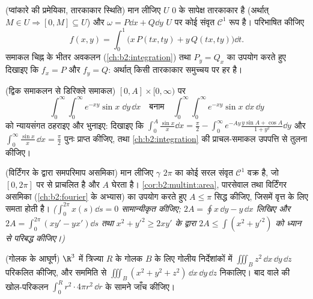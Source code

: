 \begin{exercise}[$\star\star\star$]\label{exo:b2:multint:8}
(प्वांकारे की प्रमेयिका, तारकाकार स्थिति) मान लीजिए $U$ $0$ के
सापेक्ष तारकाकार है (अर्थात् $M \in U \Rightarrow [0, M] \subseteq U$) और $\omega = P\dd x + Q\dd y$ $U$ पर कोई संवृत $\mathcal{C}^1$ रूप
है। परिभाषित कीजिए
\[
f(x, y) = \int_0^1 \bigl(x\,P(tx, ty) + y\,Q(tx, ty)\bigr)\dd t .
\]
समाकल चिह्न के भीतर अवकलन (\cref{ch:b2:integration}) तथा $P_y = Q_x$ का उपयोग करते हुए दिखाइए
कि $f_x = P$ और $f_y = Q$: अर्थात् किसी तारकाकार  समुच्चय पर हर   है।
\end{exercise}

\begin{exercise}[$\star\star\star$]\label{exo:b2:multint:9}
(द्विक समाकलन से डिरिक्ले समाकल) $[0, A] \times [0, \infty)$ पर
\[
\int_0^\infty\!\!\int_0^\infty e^{-xy}\sin x\;\dd y\,\dd x
\quad\text{बनाम}\quad
\int_0^\infty\!\!\int_0^\infty e^{-xy}\sin x\;\dd x\,\dd y
\]
को न्यायसंगत ठहराइए और भुनाइए: दिखाइए कि $\int_0^A \frac{\sin
x}{x}\dd x = \frac\pi2 - \int_0^\infty
e^{-Ay}\frac{y\sin A + \cos A}{1 + y^2}\dd y$ और $\int_0^\infty \frac{\sin x}{x}\,\dd x = \frac\pi2$ पुनः प्राप्त
कीजिए, तथा \cref{ch:b2:integration} की प्राचल-समाकल उपपत्ति से तुलना कीजिए।
\end{exercise}

\begin{exercise}[$\star\star\star$]\label{exo:b2:multint:10}
(विर्टिंगर के द्वारा समपरिमाप असमिका) मान लीजिए $\gamma$  $2\pi$ का
कोई सरल संवृत $\mathcal{C}^1$ वक्र है, जो $[0, 2\pi]$ पर  से प्राचलित है और
 $A$ घेरता है। \cref{cor:b2:multint:area}, पारसेवाल तथा विर्टिंगर असमिका
(\cref{ch:b2:fourier} के अभ्यास) का उपयोग करते हुए $A \leq \pi$ सिद्ध कीजिए, जिसमें वृत्त
के लिए समता होती है। \emph{($\int_0^{2\pi} x(s)\dd s
= 0$ सामान्यीकृत कीजिए; $2A = \oint x\,\dd y - y\,\dd x$ लिखिए और
$2A = \int_0^{2\pi}(xy' - yx')\dd
s$ तथा $x^2 + y'^2 \geq 2xy'$ के द्वारा $2A \leq
\int (x^2 + y'^2)$ को ध्यान से परिबद्ध कीजिए।)}
\end{exercise}

\begin{exercise}[$\star\star$]\label{exo:b2:multint:11}
(गोलक के आघूर्ण) $\R^3$ में त्रिज्या $R$ के गोलक $B$ के लिए गोलीय
निर्देशांकों में $\iiint_B z^2\,\dd x\,\dd y\,\dd z$ परिकलित कीजिए, और सममिति से $\iiint_B (x^2 + y^2 +
z^2)\,\dd x\,\dd y\,\dd z$ निकालिए।
बाद वाले की खोल-परिकलन $\int_0^R r^2\cdot4\pi
r^2\,\dd r$ के सामने जाँच कीजिए।
\end{exercise}

